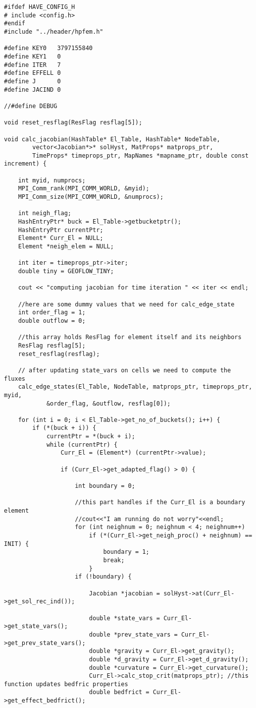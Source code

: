 \documentclass[a4paper,10pt]{article}
\begin{document}
\begin{lstlisting}
#ifdef HAVE_CONFIG_H
# include <config.h>
#endif
#include "../header/hpfem.h"

#define KEY0   3797155840
#define KEY1   0
#define ITER   7
#define EFFELL 0
#define J      0
#define JACIND 0

//#define DEBUG

void reset_resflag(ResFlag resflag[5]);

void calc_jacobian(HashTable* El_Table, HashTable* NodeTable,
		vector<Jacobian*>* solHyst, MatProps* matprops_ptr,
		TimeProps* timeprops_ptr, MapNames *mapname_ptr, double const increment) {

	int myid, numprocs;
	MPI_Comm_rank(MPI_COMM_WORLD, &myid);
	MPI_Comm_size(MPI_COMM_WORLD, &numprocs);

	int neigh_flag;
	HashEntryPtr* buck = El_Table->getbucketptr();
	HashEntryPtr currentPtr;
	Element* Curr_El = NULL;
	Element *neigh_elem = NULL;

	int iter = timeprops_ptr->iter;
	double tiny = GEOFLOW_TINY;

	cout << "computing jacobian for time iteration " << iter << endl;

	//here are some dummy values that we need for calc_edge_state
	int order_flag = 1;
	double outflow = 0;

	//this array holds ResFlag for element itself and its neighbors
	ResFlag resflag[5];
	reset_resflag(resflag);

	// after updating state_vars on cells we need to compute the fluxes
	calc_edge_states(El_Table, NodeTable, matprops_ptr, timeprops_ptr, myid,
			&order_flag, &outflow, resflag[0]);

	for (int i = 0; i < El_Table->get_no_of_buckets(); i++) {
		if (*(buck + i)) {
			currentPtr = *(buck + i);
			while (currentPtr) {
				Curr_El = (Element*) (currentPtr->value);

				if (Curr_El->get_adapted_flag() > 0) {

					int boundary = 0;

					//this part handles if the Curr_El is a boundary element
					//cout<<"I am running do not worry"<<endl;
					for (int neighnum = 0; neighnum < 4; neighnum++)
						if (*(Curr_El->get_neigh_proc() + neighnum) == INIT) {
							boundary = 1;
							break;
						}
					if (!boundary) {

						Jacobian *jacobian = solHyst->at(Curr_El->get_sol_rec_ind());

						double *state_vars = Curr_El->get_state_vars();
						double *prev_state_vars = Curr_El->get_prev_state_vars();
						double *gravity = Curr_El->get_gravity();
						double *d_gravity = Curr_El->get_d_gravity();
						double *curvature = Curr_El->get_curvature();
						Curr_El->calc_stop_crit(matprops_ptr); //this function updates bedfric properties
						double bedfrict = Curr_El->get_effect_bedfrict();


\end{lstlisting}
\end{document}
